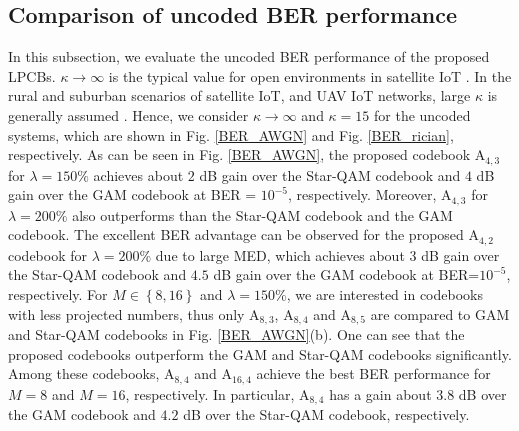 \documentclass[journal]{IEEEtran}
\begin{document}
\subsection{Comparison of uncoded BER performance}



In this subsection, we evaluate the uncoded BER performance of the proposed  LPCBs.  
    $\kappa \rightarrow \infty$ is the typical value for open environments in satellite IoT \cite{5G_NR_s_iot}. In the rural and suburban scenarios of satellite IoT, and UAV IoT networks,   large  $\kappa$  is  generally assumed \cite{lutz1991land, vucetic1992channel,ErnestNOMA}.    Hence, we consider  $\kappa \rightarrow \infty$ and $\kappa  = 15$ for the uncoded systems, which are shown in Fig. \ref{BER_AWGN} and  Fig. \ref{BER_rician}, respectively.  
   As can be seen in Fig. \ref{BER_AWGN}, the proposed codebook  $\text{A}_{4,3}$   for $\lambda = 150\%$ achieves about $2$ dB gain over the Star-QAM codebook and $4$ dB gain over the GAM codebook at BER = $10^{-5}$, respectively. Moreover,   $\text{A}_{4,3}$   for $\lambda =200\%$ also outperforms  than  the Star-QAM codebook and the GAM codebook. The excellent BER advantage  can be observed for the proposed   $\text{A}_{4,2}$  codebook for $\lambda = 200\%$ due to large MED, which achieves about $3$ dB gain over the Star-QAM codebook and $4.5$ dB gain over the GAM codebook at BER=$10^{-5}$, respectively. For $M \in \left\{8, 16 \right\}$ and $\lambda =150\%$, we are interested in   codebooks with less projected numbers, thus only $\text{A}_{8,3}$, $\text{A}_{8,4}$ and $\text{A}_{8,5}$ are compared to GAM and Star-QAM codebooks in Fig. \ref{BER_AWGN}(b). One can see that  the proposed codebooks outperform the GAM and Star-QAM codebooks significantly. Among these codebooks, $\text{A}_{8,4}$ and $\text{A}_{16,4}$ achieve the best BER performance for $M=8$ and $M=16$, respectively.  In particular,  $\text{A}_{8,4}$  has a gain about $3.8$ dB over the GAM codebook and $4.2$ dB over  the Star-QAM codebook, respectively.
\end{document}
